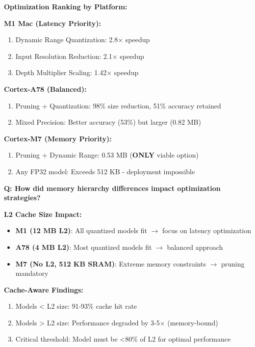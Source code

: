 \documentclass[10pt, a4paper]{article}
\begin{document}
\textbf{Optimization Ranking by Platform:}

\textbf{M1 Mac (Latency Priority):}
\begin{enumerate}
    \item Dynamic Range Quantization: 2.8× speedup
    \item Input Resolution Reduction: 2.1× speedup
    \item Depth Multiplier Scaling: 1.42× speedup
\end{enumerate}

\textbf{Cortex-A78 (Balanced):}
\begin{enumerate}
    \item Pruning + Quantization: 98\% size reduction, 51\% accuracy retained
    \item Mixed Precision: Better accuracy (53\%) but larger (0.82 MB)
\end{enumerate}

\textbf{Cortex-M7 (Memory Priority):}
\begin{enumerate}
    \item Pruning + Dynamic Range: 0.53 MB (\textbf{ONLY} viable option)
    \item Any FP32 model: Exceeds 512 KB - deployment impossible
\end{enumerate}

\textbf{Q: How did memory hierarchy differences impact optimization strategies?}

\textbf{L2 Cache Size Impact:}
\begin{itemize}
    \item \textbf{M1 (12 MB L2)}: All quantized models fit $\rightarrow$ focus on latency optimization
    \item \textbf{A78 (4 MB L2)}: Most quantized models fit $\rightarrow$ balanced approach
    \item \textbf{M7 (No L2, 512 KB SRAM)}: Extreme memory constraints $\rightarrow$ pruning mandatory
\end{itemize}

\textbf{Cache-Aware Findings:}
\begin{enumerate}
    \item Models < L2 size: 91-93\% cache hit rate
    \item Models > L2 size: Performance degraded by 3-5× (memory-bound)
    \item Critical threshold: Model must be <80\% of L2 for optimal performance
\end{enumerate}
\end{document}
